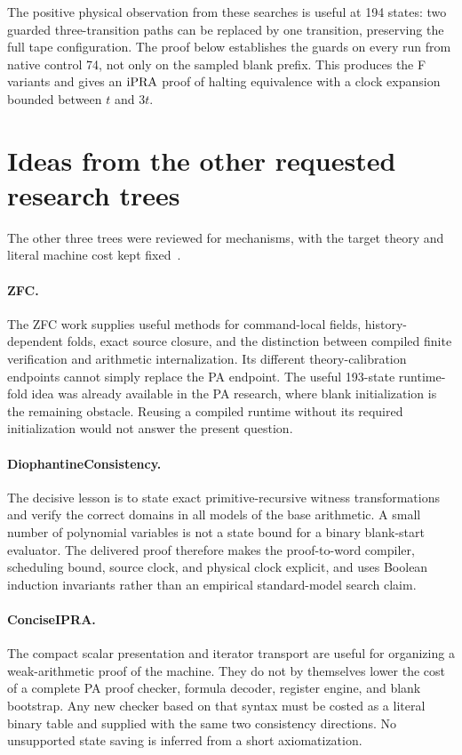 The positive physical observation from these searches is useful at
194 states: two guarded three-transition paths can be replaced by
one transition, preserving the full tape configuration. The proof below
establishes the guards on every run from native control 74, not only
on the sampled blank prefix. This produces the F variants and gives
an $\mathrm{iPRA}$ proof of halting equivalence with a clock expansion bounded
between $t$ and $3t$.

\section{Ideas from the other requested research trees}

The other three trees were reviewed for mechanisms, with the target
theory and literal machine cost kept fixed~\cite{other}.

\paragraph{ZFC.}
The ZFC work supplies useful methods for command-local fields,
history-dependent folds, exact source closure, and the distinction
between compiled finite verification and arithmetic internalization.
Its different theory-calibration endpoints cannot simply replace the
PA endpoint. The useful 193-state runtime-fold idea was already
available in the PA research, where blank initialization is the
remaining obstacle. Reusing a compiled runtime without its required
initialization would not answer the present question.

\paragraph{DiophantineConsistency.}
The decisive lesson is to state exact primitive-recursive witness
transformations and verify the correct domains in all models of the
base arithmetic. A small number of polynomial variables is not a
state bound for a binary blank-start evaluator. The delivered proof
therefore makes the proof-to-word compiler, scheduling bound, source
clock, and physical clock explicit, and uses Boolean induction
invariants rather than an empirical standard-model search claim.

\paragraph{ConciseIPRA.}
The compact scalar presentation and iterator transport are useful
for organizing a weak-arithmetic proof of the machine. They do not
by themselves lower the cost of a complete PA proof checker, formula
decoder, register engine, and blank bootstrap. Any new checker based
on that syntax must be costed as a literal binary table and supplied
with the same two consistency directions. No unsupported state saving
is inferred from a short axiomatization.


